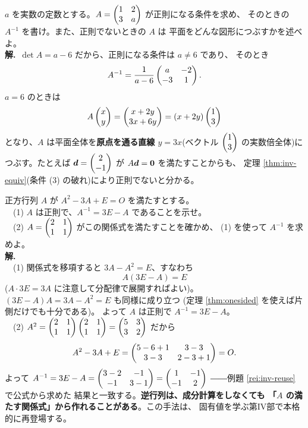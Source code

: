 \begin{rei}[例題・標準(文字を含む行列)]\label{rei:inv-case}
$a$ を実数の定数とする。$A = \begin{pmatrix}1 & 2 \\ 3 & a\end{pmatrix}$ が正則になる条件を求め、
そのときの $A^{-1}$ を書け。また、正則でないときの $A$ は
平面をどんな図形につぶすかを述べよ。\\
\textbf{解.}\ $\det A = a - 6$ だから、正則になる条件は $a \neq 6$ であり、
そのとき
\[
A^{-1} = \frac{1}{a - 6}\begin{pmatrix}a & -2 \\ -3 & 1\end{pmatrix}.
\]
$a = 6$ のときは
\[
A\begin{pmatrix}x \\ y\end{pmatrix} = \begin{pmatrix}x + 2y \\ 3x + 6y\end{pmatrix} = (x + 2y)\begin{pmatrix}1 \\ 3\end{pmatrix}
\]
となり、$A$ は平面全体を\textbf{原点を通る直線 $y = 3x$}(ベクトル
$\begin{pmatrix}1 \\ 3\end{pmatrix}$ の実数倍全体)につぶす。たとえば
$\bm{d} = \begin{pmatrix}2 \\ -1\end{pmatrix}$ が $A\bm{d} = \bm{0}$ を満たすことからも、
定理 \ref{thm:inv-equiv}(条件 (3) の破れ)により正則でないと分かる。
\end{rei}

\begin{rei}[例題・標準(関係式から逆行列を作る)]\label{rei:inv-cayley}
正方行列 $A$ が $A^2 - 3A + E = O$ を満たすとする。\\
　(1) $A$ は正則で、$A^{-1} = 3E - A$ であることを示せ。\\
　(2) $A = \begin{pmatrix}2 & 1 \\ 1 & 1\end{pmatrix}$ がこの関係式を満たすことを確かめ、
(1) を使って $A^{-1}$ を求めよ。\\
\textbf{解.}\\
　(1) 関係式を移項すると $3A - A^2 = E$、すなわち
\[
A(3E - A) = E
\]
($A \cdot 3E = 3A$ に注意して分配律で展開すればよい)。
$(3E - A)A = 3A - A^2 = E$ も同様に成り立つ
(定理 \ref{thm:onesided} を使えば片側だけでも十分である)。
よって $A$ は正則で $A^{-1} = 3E - A$。\\
　(2) $A^2 = \begin{pmatrix}2 & 1 \\ 1 & 1\end{pmatrix}\begin{pmatrix}2 & 1 \\ 1 & 1\end{pmatrix} = \begin{pmatrix}5 & 3 \\ 3 & 2\end{pmatrix}$
だから
\[
A^2 - 3A + E = \begin{pmatrix}5 - 6 + 1 & 3 - 3 \\ 3 - 3 & 2 - 3 + 1\end{pmatrix} = O.
\]
よって $A^{-1} = 3E - A = \begin{pmatrix}3 - 2 & -1 \\ -1 & 3 - 1\end{pmatrix}
= \begin{pmatrix}1 & -1 \\ -1 & 2\end{pmatrix}$ ――例題 \ref{rei:inv-reuse} で公式から求めた
結果と一致する。\textbf{逆行列は、成分計算をしなくても
「$A$ の満たす関係式」から作れることがある}。この手法は、
固有値を学ぶ第IV部で本格的に再登場する。
\end{rei}

